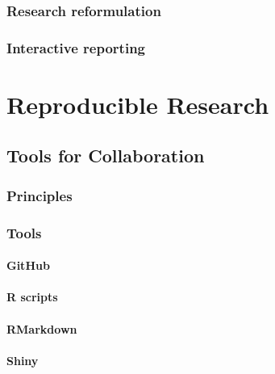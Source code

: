 \documentclass[
]{book}
\begin{document}
\hypertarget{research-reformulation}{%
\section{Research reformulation}\label{research-reformulation}}

\hypertarget{interactive-reporting}{%
\section{Interactive reporting}\label{interactive-reporting}}

\hypertarget{part-reproducible-research}{%
\part*{Reproducible Research}\label{part-reproducible-research}}

\hypertarget{tools_for_colab}{%
\chapter{Tools for Collaboration}\label{tools_for_colab}}

\hypertarget{principles-1}{%
\section{Principles}\label{principles-1}}

\hypertarget{tools}{%
\section{Tools}\label{tools}}

\hypertarget{github-1}{%
\subsection{GitHub}\label{github-1}}

\hypertarget{r-scripts}{%
\subsection{R scripts}\label{r-scripts}}

\hypertarget{rmarkdown}{%
\subsection{RMarkdown}\label{rmarkdown}}

\hypertarget{shiny}{%
\subsection{Shiny}\label{shiny}}
\end{document}
